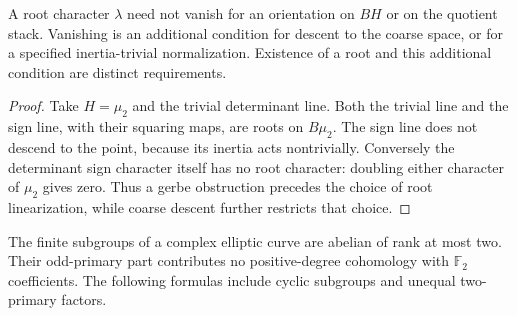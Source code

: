 \begin{proposition}
\label{prop:finite-stabilizer-linearization-character-criterion}
\label{prop:finite-stabilizer-linearization-vanishing-criterion}
\label{prop:finite-stabilizer-gerbe-linearization-independence}
A root character \(\lambda\) need not vanish for an orientation on
\(BH\) or on the quotient stack.  Vanishing is an additional condition
for descent to the coarse space, or for a specified inertia-trivial
normalization.  Existence of a root and this additional condition are
distinct requirements.
\end{proposition}
\begin{proof}
Take \(H=\mu_2\) and the trivial determinant line.  Both the trivial
line and the sign line, with their squaring maps, are roots on
\(B\mu_2\).  The sign line does not descend to the point, because its
inertia acts nontrivially.  Conversely the determinant sign character
itself has no root character: doubling either character of \(\mu_2\)
gives zero.  Thus a gerbe obstruction precedes the choice of root
linearization, while coarse descent further restricts that choice.
\end{proof}

The finite subgroups of a complex elliptic curve are abelian of rank
at most two.  Their odd-primary part contributes no positive-degree
cohomology with \(\mathbb F_2\) coefficients.  The following formulas
include cyclic subgroups and unequal two-primary factors.

